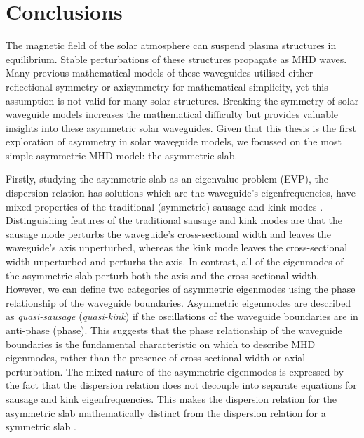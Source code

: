 \chapter{Conclusions}
\label{chap: conclusion}

The magnetic field of the solar atmosphere can suspend plasma structures in equilibrium. Stable perturbations of these structures propagate as MHD waves. Many previous mathematical models of these waveguides utilised either reflectional symmetry or axisymmetry for mathematical simplicity, yet this assumption is not valid for many solar structures. Breaking the symmetry of solar waveguide models increases the mathematical difficulty but provides valuable insights into these asymmetric solar waveguides. Given that this thesis is the first exploration of asymmetry in solar waveguide models, we focussed on the most simple asymmetric MHD model: the asymmetric slab.

Firstly, studying the asymmetric slab as an eigenvalue problem (EVP), the dispersion relation has solutions which are the waveguide's eigenfrequencies, have mixed properties of the traditional (symmetric) sausage and kink modes \citep{all_etal17}. Distinguishing features of the traditional sausage and kink modes are that the sausage mode perturbs the waveguide's cross-sectional width and leaves the waveguide's axis unperturbed, whereas the kink mode leaves the cross-sectional width unperturbed and perturbs the axis. In contrast, all of the eigenmodes of the asymmetric slab perturb both the axis and the cross-sectional width. However, we can define two categories of asymmetric eigenmodes using the phase relationship of the waveguide boundaries. Asymmetric eigenmodes are described as \textit{quasi-sausage} (\textit{quasi-kink}) if the oscillations of the waveguide boundaries are in anti-phase (phase). This suggests that the phase relationship of the waveguide boundaries is the fundamental characteristic on which to describe MHD eigenmodes, rather than the presence of cross-sectional width or axial perturbation.  The mixed nature of the asymmetric eigenmodes is expressed by the fact that the dispersion relation does not decouple into separate equations for sausage and kink eigenfrequencies. This makes the dispersion relation for the asymmetric slab mathematically distinct from the dispersion relation for a symmetric slab \citep{rob81b,edw_etal82}.

